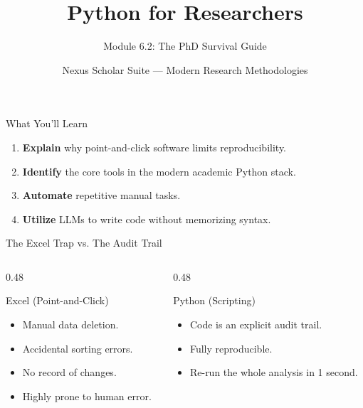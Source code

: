 \documentclass[aspectratio=169]{beamer}
\title{Python for Researchers}
\subtitle{Module 6.2: The PhD Survival Guide}
\author{Nexus Scholar Suite --- Modern Research Methodologies}
\date{}
\begin{document}
\begin{frame}[plain]
  \titlepage
\end{frame}

\begin{frame}{What You'll Learn}
  \begin{enumerate}
    \item \textbf{Explain} why point-and-click software limits reproducibility.
    \item \textbf{Identify} the core tools in the modern academic Python stack.
    \item \textbf{Automate} repetitive manual tasks.
    \item \textbf{Utilize} LLMs to write code without memorizing syntax.
  \end{enumerate}
\end{frame}

\begin{frame}{The Excel Trap vs. The Audit Trail}
  \begin{columns}[T]
    \begin{column}{0.48\textwidth}
      \begin{alertblock}{Excel (Point-and-Click)}
        \begin{itemize}
          \item Manual data deletion.
          \item Accidental sorting errors.
          \item No record of changes.
          \item Highly prone to human error.
        \end{itemize}
      \end{alertblock}
    \end{column}
    \begin{column}{0.48\textwidth}
      \begin{exampleblock}{Python (Scripting)}
        \begin{itemize}
          \item Code is an explicit audit trail.
          \item Fully reproducible.
          \item Re-run the whole analysis in 1 second.
        \end{itemize}
      \end{exampleblock}
    \end{column}
  \end{columns}
\end{frame}
\end{document}
